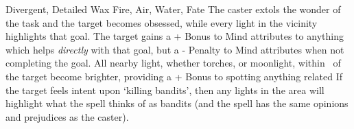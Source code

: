   {Divergent, Detailed}%
  {Wax}%
  {Fire, Air, Water, Fate}%
  {}%
  {The caster extols the wonder of the task and the target becomes obsessed, while every light in the vicinity highlights that goal.
  The target gains a + Bonus to Mind \glspl{attribute} to anything which helps \emph{directly} with that goal, but a - Penalty to Mind \glspl{attribute} when not completing the goal.
  All nearby light, whether torches, or moonlight, within \spellRange\ of the target become brighter, providing a + Bonus to spotting anything related}%
  {
  If the target feels intent upon `killing bandits', then any lights in the area will highlight what the spell thinks of as bandits (and the spell has the same opinions and prejudices as the caster).}

